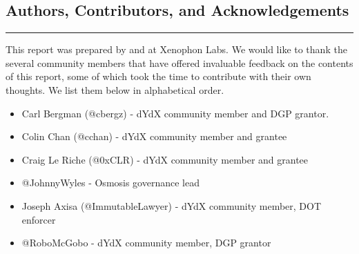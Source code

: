 \begin{fullwidth}
    \section{Authors, Contributors, and Acknowledgements} \label{app:authors}

    \textcolor{gray}{\rule{\linewidth}{0.1mm}}
\end{fullwidth}
    
    This report was prepared by  and  at Xenophon Labs. We would like to thank the several community members that have offered invaluable feedback on the contents of this report, some of which took the time to contribute with their own thoughts. We list them below in alphabetical order.

    \begin{itemize}
        \item Carl Bergman (@cbergz) - dYdX community member and DGP grantor.
        \item Colin Chan (@cchan) - dYdX community member and grantee
        \item Craig Le Riche (@0xCLR) - dYdX community member and grantee
        \item @JohnnyWyles - Osmosis governance lead
        \item Joseph Axisa (@ImmutableLawyer) - dYdX community member, DOT enforcer
        \item @RoboMcGobo - dYdX community member, DGP grantor
    \end{itemize}
